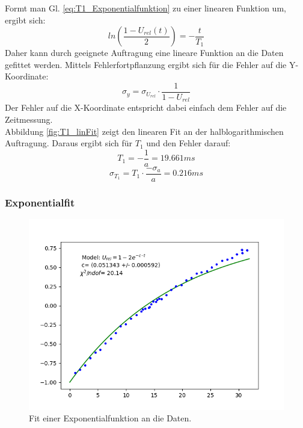 \documentclass[12pt,a4paper]{article}
\begin{document}
Formt man Gl. \ref{eq:T1_Exponentialfunktion} zu einer linearen Funktion um, ergibt sich:
\begin{equation}
ln\left(\dfrac{1 - U_{rel} (t)}{2}\right) = -\dfrac{t}{T_1}
\label{eq:T1_linFunktion}
\end{equation}
Daher kann durch geeignete Auftragung eine lineare Funktion an die Daten gefittet werden. Mittels Fehlerfortpflanzung ergibt sich für die Fehler auf die Y-Koordinate:
\begin{equation}
\sigma _y = \sigma _{U_{rel}} \cdot \dfrac{1}{1 - U_{rel}}
\end{equation}
Der Fehler auf die X-Koordinate entspricht dabei einfach dem Fehler auf die Zeitmessung.\\
Abbildung \ref{fig:T1_linFit} zeigt den linearen Fit an der halblogarithmischen Auftragung. Daraus ergibt sich für $T_1$ und den Fehler darauf:
\begin{equation*}
T_1 = -\dfrac{1}{a} = 19.661 ms
\end{equation*}
\begin{equation*}
\sigma _{T_1} = T_1 \cdot \dfrac{-\sigma _a}{a} = 0.216 ms
\end{equation*}

\subsubsection{Exponentialfit}

\begin{figure}
\centering
\includegraphics[scale=0.7]{Bilder/T1_expFit.PNG}
\caption{Fit einer Exponentialfunktion an die Daten.}
\label{fig:T1_expFit}
\end{figure}
\end{document}
